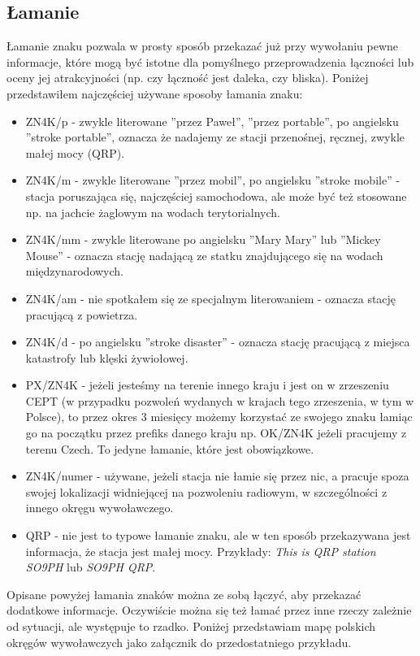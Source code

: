 \documentclass[a4paper,11pt]{article}
\begin{document}
\subsection{Łamanie}
Łamanie znaku pozwala w prosty sposób przekazać już przy wywołaniu pewne informacje, które mogą być istotne dla pomyślnego przeprowadzenia łączności lub oceny jej atrakcyjności (np. czy łączność jest daleka, czy bliska). Poniżej przedstawiłem najczęściej używane sposoby łamania znaku:
\begin{itemize}
\item ZN4K/p - zwykle literowane ''przez Paweł'', ''przez portable'', po angielsku ''stroke portable'', oznacza że nadajemy ze stacji przenośnej, ręcznej, zwykle małej mocy (QRP).
\item ZN4K/m - zwykle literowane ''przez mobil'', po angielsku ''stroke mobile'' - stacja poruszająca się, najczęściej samochodowa, ale może być też stosowane np. na jachcie żaglowym na wodach terytorialnych.
\item ZN4K/mm - zwykle literowane po angielsku ''Mary Mary'' lub ''Mickey Mouse'' - oznacza stację nadającą ze statku znajdującego się na wodach międzynarodowych.
\item ZN4K/am - nie spotkałem się ze specjalnym literowaniem - oznacza stację pracującą z powietrza.
\item ZN4K/d - po angielsku ''stroke disaster'' - oznacza stację pracującą z miejsca katastrofy lub klęski żywiołowej.
\item PX/ZN4K - jeżeli jesteśmy na terenie innego kraju i jest on w zrzeszeniu CEPT (w przypadku pozwoleń wydanych w krajach tego zrzeszenia, w tym w Polsce), to przez okres 3 miesięcy możemy korzystać ze swojego znaku łamiąc go na początku przez prefiks danego kraju np. OK/ZN4K jeżeli pracujemy z terenu Czech. To jedyne łamanie, które jest obowiązkowe.
\item ZN4K/numer - używane, jeżeli stacja nie łamie się przez nic, a pracuje spoza swojej lokalizacji widniejącej na pozwoleniu radiowym, w szczególności z innego okręgu wywoławczego.
\item QRP - nie jest to typowe łamanie znaku, ale w ten sposób przekazywana jest informacja, że stacja jest małej mocy. Przykłady: \textit{This is QRP station SO9PH} lub \textit{SO9PH QRP}.
\end{itemize}
Opisane powyżej łamania znaków można ze sobą łączyć, aby przekazać dodatkowe informacje. Oczywiście można się też łamać przez inne rzeczy zależnie od sytuacji, ale występuje to rzadko. Poniżej przedstawiam mapę polskich okręgów wywoławczych jako załącznik do przedostatniego przykładu.
\end{document}
